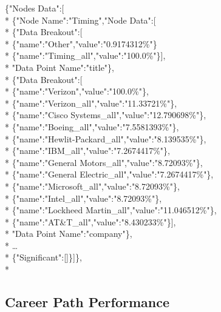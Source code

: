 \noindent \{"Nodes Data":[\\*
	\indent \{"Node Name":"Timing","Node Data":[\\*
		\indent \{"Data Breakout":[\\*
		\indent \indent	\{"name":"Other","value":"0.9174312\%"\}\\*
		\indent	\indent \{"name":"Timing_all","value":"100.0\%"\}],\\*
		\indent	"Data Point Name":"title"\},\\*
		\indent\{"Data Breakout":[\\*
		\indent	\indent	\{"name":"Verizon","value":"100.0\%"\},\\*
		\indent	\indent	\{"name":"Verizon_all","value":"11.33721\%"\},\\*
		\indent	\indent	\{"name":"Cisco Systems_all","value":"12.790698\%"\},\\*
		\indent	\indent	\{"name":"Boeing_all","value":"7.5581393\%"\},\\*
		\indent	\indent	\{"name":"Hewlit-Packard_all","value":"8.139535\%"\},\\*
		\indent	\indent	\{"name":"IBM_all","value":"7.2674417\%"\},\\*
		\indent	\indent	\{"name":"General Motors_all","value":"8.72093\%"\},\\*
		\indent	\indent	\{"name":"General Electric_all","value":"7.2674417\%"\},\\*
		\indent	\indent	\{"name":"Microsoft_all","value":"8.72093\%"\},\\*
		\indent	\indent	\{"name":"Intel_all","value":"8.72093\%"\},\\*
		\indent	\indent	\{"name":"Lockheed Martin_all","value":"11.046512\%"\},\\*
		\indent	\indent	\{"name":"AT&T_all","value":"8.430233\%"\}],\\*
		\indent"Data Point Name":"company"\},\\*
		\indent\ldots\\*
		\indent \{"Significant":[]\}]\},\\*

\subsection{Career Path Performance}